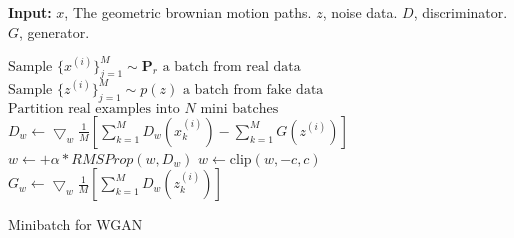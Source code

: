 \documentclass{article}
\begin{document}
\begin{algorithm}
	\textbf{Input:} $x$, The geometric brownian motion paths. $z$, noise data. $D$, discriminator. $G$, generator.
	
  {
  	$\text{Sample $\{x^{(i)}\}_{j=1}^{M} \sim \mathbf{P}_r$ a batch from real data}$
  	$\text{Sample $\{z^{(i)}\}_{j=1}^{M} \sim p(z)$ a batch from fake data}$
  	$\text{Partition real examples into $N$ mini batches }$ \\
  	{
    	{
    		$D_w \leftarrow \bigtriangledown_{w}\frac{1}{M}[\sum_{k=1}^{M}D_{w}(x_{k}^{(i)})-\sum_{k=1}^{M}G(z^{(i)})]$
    		$w \leftarrow + \alpha*RMSProp(w,D_w)$
    		$w \leftarrow \text{clip}(w,-c,c)$
    	}
    	$G_w \leftarrow \bigtriangledown_{w}\frac{1}{M}[\sum_{k=1}^{M}D_{w}(z_{k}^{(i)})]$
    }
  }
  \caption{Minibatch for WGAN}
\end{algorithm}
\end{document}
